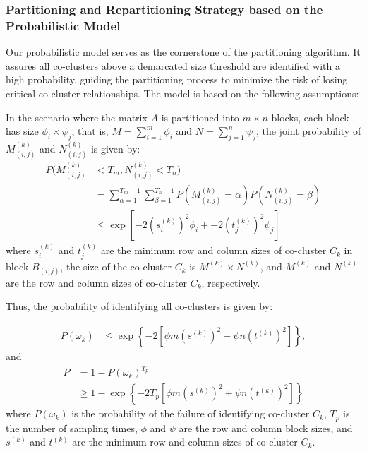 \documentclass[journal]{IEEEtran}
\begin{document}
\subsubsection{Partitioning and Repartitioning Strategy based on the Probabilistic Model}

Our probabilistic model serves as the cornerstone of the partitioning algorithm. It assures all co-clusters above a demarcated size threshold are identified with a high probability, guiding the partitioning process to minimize the risk of losing critical co-cluster relationships. The model is based on the following assumptions:

In the scenario where the matrix $A$ is partitioned into $m \times n$ blocks, each block has size $\phi_i \times \psi_j$, that is, $M=\sum_{i=1}^m \phi_i$ and $N=\sum_{j=1}^n \psi_j$, the joint probability of $M_{(i,j)}^{(k)}$ and $N_{(i,j)}^{(k)}$ is given by:
\begin{align*}
  P(M_{(i,j)}^{(k)} & < T_m, N_{(i,j)}^{(k)} < T_n)                                                                           \\
                    & = \sum_{\alpha=1}^{T_m-1} \sum_{\beta=1}^{T_n-1} P(M_{(i,j)}^{(k)} = \alpha) P(N_{(i,j)}^{(k)} = \beta) \\
                    & \le \exp[-2 (s_i^{(k)})^2 \phi_i + -2 (t_j^{(k)})^2 \psi_j]
\end{align*}
where $s_i^{(k)}$ and $t_j^{(k)}$ are the minimum row and column sizes of co-cluster $C_k$ in block $B_{(i,j)}$, the size of the co-cluster $C_k$ is $M^{(k)} \times N^{(k)}$, and $M^{(k)}$ and $N^{(k)}$ are the row and column sizes of co-cluster $C_k$, respectively.

Thus, the probability of identifying all co-clusters is given by:

\begin{align}
  P(\omega_k) & \le \exp \left\{ -2 [\phi m (s^{(k)})^2 + \psi n (t^{(k)})^2] \right\},
\end{align}
and
\begin{align}
  P & = 1 - P(\omega_k)^{T_p}                                                                                                       \\
    & \ge 1 - \exp \left\{ -2 T_p [\phi m (s^{(k)})^2 + \psi n (t^{(k)})^2] \right\} \label{eq:prob_of_identifying_all_co_clusters}
\end{align}
where $P(\omega_k)$ is the probability of the failure of identifying co-cluster $C_k$, $T_p$ is the number of sampling times, $\phi$ and $\psi$ are the row and column block sizes, and $s^{(k)}$ and $t^{(k)}$ are the minimum row and column sizes of co-cluster $C_k$.
\end{document}
